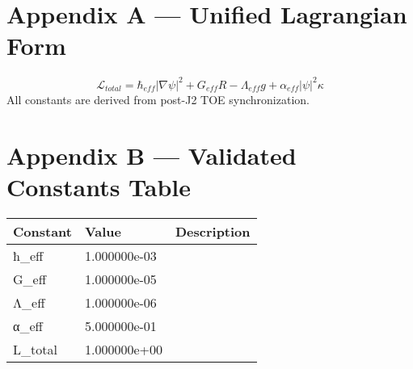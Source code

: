 
\section*{Appendix A — Unified Lagrangian Form}
\[
\mathcal{L}_{total} =
\hbar_{eff} |\nabla \psi|^2 + G_{eff} R - \Lambda_{eff} g + \alpha_{eff} |\psi|^2 \kappa
\]
All constants are derived from post-J2 TOE synchronization.


\section*{Appendix B — Validated Constants Table}
\begin{tabular}{lll}
\textbf{Constant} & \textbf{Value} & \textbf{Description} \\
\hline
ħ_eff & 1.000000e-03 &  \\
G_eff & 1.000000e-05 &  \\
Λ_eff & 1.000000e-06 &  \\
α_eff & 5.000000e-01 &  \\
L_total & 1.000000e+00 &  \\
\end{tabular}
